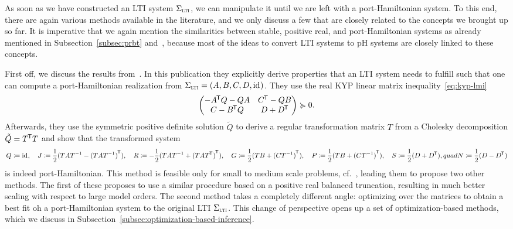 As soon as we have constructed an LTI system $\Sigma_{\textnormal{\scshape lti}}$, we can manipulate it until we are left with a port-Hamiltonian system.
To this end, there are again various methods available in the literature, and we only discuss a few that are closely related to the concepts we brought up so far.
It is imperative that we again mention the similarities between stable, positive real, and port-Hamiltonian systems as already mentioned in Subsection~\ref{subsec:prbt} and~\cite{Cherifi2022}, because most of the ideas to convert LTI systems to pH systems are closely linked to these concepts.

First off, we discuss the results from~\cite{Beattie2022}.
In this publication they explicitly derive properties that an LTI system needs to fulfill such that one can compute a port-Hamiltonian realization from $\Sigma_{\textnormal{\scshape lti}} = (A, B, C, D, \text{id}_{})$.
They use the real KYP linear matrix inequality~\eqref{eq:kyp-lmi}
\begin{equation*}
    \begin{pmatrix}
        - A^{\mkern-1.5mu \mathsf{T}} Q - Q A & C^{\mkern-1.5mu \mathsf{T}} - QB \\
        C - B^{\mkern-1.5mu \mathsf{T}} Q & D + D^{\mkern-1.5mu \mathsf{T}}
    \end{pmatrix} \succcurlyeq 0.
\end{equation*}
Afterwards, they use the symmetric positive definite solution $\tilde{Q}$ to derive a regular transformation matrix $T$ from a Cholesky decomposition $\tilde{Q} = T^{\mkern-1.5mu \mathsf{T}} T$ and show that the transformed system
\begin{equation}\label{eq:ph-transformation-from-passive-system}
    Q \coloneqq \text{id}_{},\quad J \coloneqq \frac{1}{2} (T A T^{-1} - {(T A T^{-1})}^{\mkern-1.5mu \mathsf{T}}),\quad R \coloneqq -\frac{1}{2} (T A T^{-1} + {(T A T^{\mkern-1.5mu \mathsf{T}})}^{\mkern-1.5mu \mathsf{T}}),\quad G \coloneqq \frac{1}{2} (T B + {(C T^{-1})}^{\mkern-1.5mu \mathsf{T}}),\quad P \coloneqq \frac{1}{2} (T B + {(C T^{-1})}^{\mkern-1.5mu \mathsf{T}}),\quad S \coloneqq \frac{1}{2} (D + D^{\mkern-1.5mu \mathsf{T}}),quad N \coloneqq \frac{1}{2} (D - D^{\mkern-1.5mu \mathsf{T}})
\end{equation}
is indeed port-Hamiltonian.
This method is feasible only for small to medium scale problems, cf.~\cite{Cherifi2019}, leading them to propose two other methods.
The first of these proposes to use a similar procedure based on a positive real balanced truncation, resulting in much better scaling with respect to large model orders.
The second method takes a completely different angle: optimizing over the matrices to obtain a best fit oh a port-Hamiltonian system to the original LTI $\Sigma_{\textnormal{\scshape lti}}$.
This change of perspective opens up a set of optimization-based methods, which we discuss in Subsection~\ref{subsec:optimization-based-inference}.

